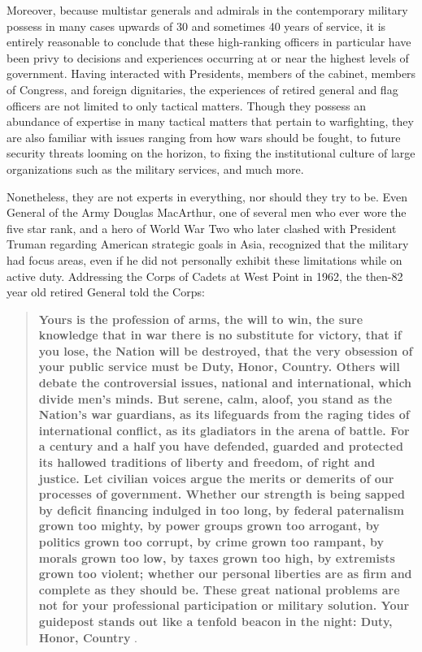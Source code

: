 \documentclass[12pt,]{article}
\begin{document}
Moreover, because multistar generals and admirals in the contemporary military possess in many cases upwards of 30 and sometimes 40 years of service, it is entirely reasonable to conclude that these high-ranking officers in particular have been privy to decisions and experiences occurring at or near the highest levels of government. Having interacted with Presidents, members of the cabinet, members of Congress, and foreign dignitaries, the experiences of retired general and flag officers are not limited to only tactical matters. Though they possess an abundance of expertise in many tactical matters that pertain to warfighting, they are also familiar with issues ranging from how wars should be fought, to future security threats looming on the horizon, to fixing the institutional culture of large organizations such as the military services, and much more.

Nonetheless, they are not experts in everything, nor should they try to be. Even General of the Army Douglas MacArthur, one of several men who ever wore the five star rank, and a hero of World War Two who later clashed with President Truman regarding American strategic goals in Asia, recognized that the military had focus areas, even if he did not personally exhibit these limitations while on active duty. Addressing the Corps of Cadets at West Point in 1962, the then-82 year old retired General told the Corps:

\singlespacing

\begin{quote}
\textbf{Yours is the profession of arms, the will to win, the sure knowledge that in war there is no substitute for victory, that if you lose, the Nation will be destroyed, that the very obsession of your public service must be Duty, Honor, Country. Others will debate the controversial issues, national and international, which divide men's minds. But serene, calm, aloof, you stand as the Nation's war guardians, as its lifeguards from the raging tides of international conflict, as its gladiators in the arena of battle. For a century and a half you have defended, guarded and protected its hallowed traditions of liberty and freedom, of right and justice. Let civilian voices argue the merits or demerits of our processes of government. Whether our strength is being sapped by deficit financing indulged in too long, by federal paternalism grown too mighty, by power groups grown too arrogant, by politics grown too corrupt, by crime grown too rampant, by morals grown too low, by taxes grown too high, by extremists grown too violent; whether our personal liberties are as firm and complete as they should be. These great national problems are not for your professional participation or military solution. Your guidepost stands out like a tenfold beacon in the night: Duty, Honor, Country} \autocite{macarthur_duty_1962}.
\end{quote}
\end{document}
